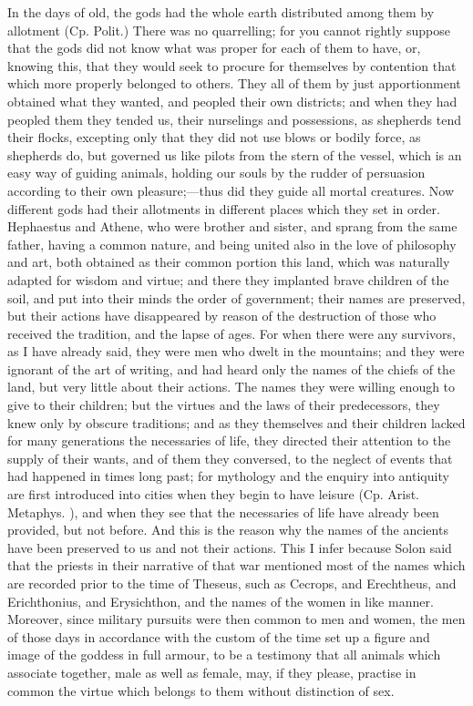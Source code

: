 \documentclass[11pt,letter]{article}
\begin{document}
\par  In the days of old, the gods had the whole earth distributed among them by allotment (Cp. Polit.) There was no quarrelling; for you cannot rightly suppose that the gods did not know what was proper for each of them to have, or, knowing this, that they would seek to procure for themselves by contention that which more properly belonged to others. They all of them by just apportionment obtained what they wanted, and peopled their own districts; and when they had peopled them they tended us, their nurselings and possessions, as shepherds tend their flocks, excepting only that they did not use blows or bodily force, as shepherds do, but governed us like pilots from the stern of the vessel, which is an easy way of guiding animals, holding our souls by the rudder of persuasion according to their own pleasure;—thus did they guide all mortal creatures. Now different gods had their allotments in different places which they set in order. Hephaestus and Athene, who were brother and sister, and sprang from the same father, having a common nature, and being united also in the love of philosophy and art, both obtained as their common portion this land, which was naturally adapted for wisdom and virtue; and there they implanted brave children of the soil, and put into their minds the order of government; their names are preserved, but their actions have disappeared by reason of the destruction of those who received the tradition, and the lapse of ages. For when there were any survivors, as I have already said, they were men who dwelt in the mountains; and they were ignorant of the art of writing, and had heard only the names of the chiefs of the land, but very little about their actions. The names they were willing enough to give to their children; but the virtues and the laws of their predecessors, they knew only by obscure traditions; and as they themselves and their children lacked for many generations the necessaries of life, they directed their attention to the supply of their wants, and of them they conversed, to the neglect of events that had happened in times long past; for mythology and the enquiry into antiquity are first introduced into cities when they begin to have leisure (Cp. Arist. Metaphys. ), and when they see that the necessaries of life have already been provided, but not before. And this is the reason why the names of the ancients have been preserved to us and not their actions. This I infer because Solon said that the priests in their narrative of that war mentioned most of the names which are recorded prior to the time of Theseus, such as Cecrops, and Erechtheus, and Erichthonius, and Erysichthon, and the names of the women in like manner. Moreover, since military pursuits were then common to men and women, the men of those days in accordance with the custom of the time set up a figure and image of the goddess in full armour, to be a testimony that all animals which associate together, male as well as female, may, if they please, practise in common the virtue which belongs to them without distinction of sex.
\end{document}
